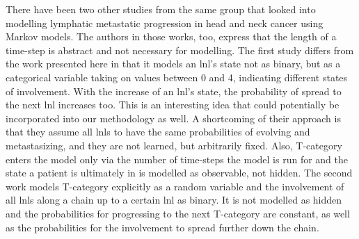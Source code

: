 \documentclass[\relativeRoot/main.tex]{subfiles}
\begin{document}
There have been two other studies \cite{benson_markov_2006,jung_development_2016} from the same group that looked into modelling lymphatic metastatic progression in head and neck cancer using Markov models. The authors in those works, too, express that the length of a time-step is abstract and not necessary for modelling. The first study \cite{benson_markov_2006} differs from the work presented here in that it models an \gls{lnl}'s state not as binary, but as a categorical variable taking on values between 0 and 4, indicating different states of involvement. With the increase of an \gls{lnl}'s state, the probability of spread to the next \gls{lnl} increases too. This is an interesting idea that could potentially be incorporated into our methodology as well. A shortcoming of their approach is that they assume all \glspl{lnl} to have the same probabilities of evolving and metastasizing, and they are not learned, but arbitrarily fixed. Also, T-category enters the model only via the number of time-steps the model is run for and the state a patient is ultimately in is modelled as observable, not hidden. The second work \cite{jung_development_2016} models T-category explicitly as a random variable and the involvement of all \glspl{lnl} along a chain up to a certain \gls{lnl} as binary. It is not modelled as hidden and the probabilities for progressing to the next T-category are constant, as well as the probabilities for the involvement to spread further down the chain.
\end{document}
